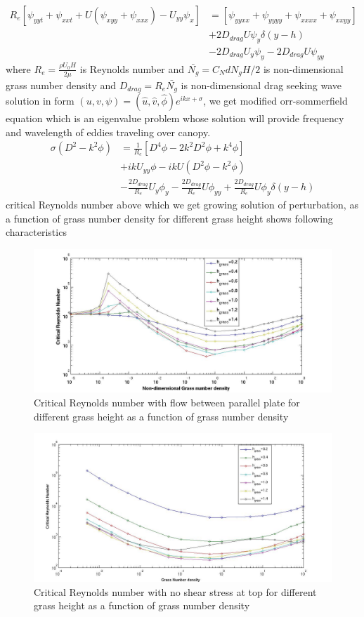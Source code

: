 \documentclass[aps,preprint,floatfix,prl]{revtex4-1}
\begin{document}
\begin{equation}
\begin{split}
 R_{e}\left[\psi_{yyt}+\psi_{xxt}+U\left(\psi_{xyy}+\psi_{xxx}\right)-U_{yy}\psi_{x} \right] &=\left[\psi_{yyxx}+\psi_{yyyy}+\psi_{xxxx}+\psi_{xxyy} \right]\\
& + 2D_{drag}U\psi_{y}\delta(y-h)\\
& - 2D_{drag}U_{y}\psi_{y} -2D_{drag}U\psi_{yy}
\end{split}
\end{equation}
where $R_{e}= \frac{\rho U_0 H}{2\mu}$ is Reynolds number and $\bar{N_g} = C_N d N_g H/2$ is non-dimensional grass number density and  $D_{drag} = R_{e}\bar{N_{g}}$ is non-dimensional drag
 seeking wave solution in form $\left(u,v,\psi \right)= \left(\hat u, \hat v, \hat\phi \right)e^{ikx+\sigma}$, we get modified orr-sommerfield equation which is an eigenvalue problem
whose solution will provide frequency and wavelength of eddies traveling over canopy.
\begin{equation}
\begin{split}
\sigma \left(D^2-k^2\phi \right) &= \frac{1}{R_{e}}\left[D^4\phi -2k^{2}D^2\phi +k^{4}\phi \right]\\
				  & +ikU_{yy}\phi-ikU\left(D^2\phi-k^2\phi \right)\\
 & -\frac{2D_{drag}}{R_{e}}U_{y}\phi_{y}-\frac{2D_{drag}}{R_{e}}U\phi_{yy}+\frac{2D_{drag}}{R_{e}}U\phi_{y}\delta(y-h)
\end{split}
\end{equation}
critical Reynolds number above which we get growing solution of perturbation, as a function of grass number density for different grass height shows following characteristics 
  \begin{figure}[htb!]
  \includegraphics[scale=0.35]{Instability2}
\caption{Critical Reynolds number with flow between parallel plate for different grass height as a function of grass number density}
\end{figure}

\begin{figure}[htb!]
  \includegraphics[scale=0.35]{Instability1_free.jpg}
\caption{Critical Reynolds number with no shear stress at top for different grass height as a function of grass number density}
\end{figure}
\end{document}
